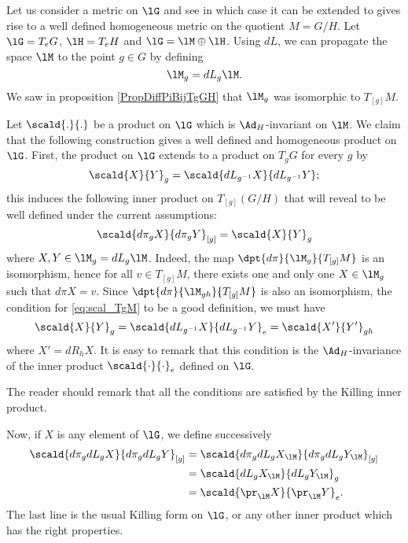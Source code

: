 Let us consider a metric on $\lG$ and see in which case it can be extended to gives rise to a well defined homogeneous metric on the quotient $M=G/H$. Let $\lG=T_eG$, $\lH=T_eH$ and $\lG=\lM\oplus\lH$. Using $dL$, we can propagate the space $\lM$ to the point $g\in G$ by defining
\[
  \lM_g=dL_g\lM.\label{pg:M_g}
\]
We saw in proposition \ref{PropDiffPiBijTgGH} that $\lM_g$ was isomorphic to $T_{[g]}M$.


Let $\scald{.}{.}$ be a product on $\lG$ which is $\Ad_H$-invariant on $\lM$. We claim that the following construction gives a well defined and homogeneous product on $\lG$. First, the product on $\lG$ extends to a product on $T_gG$ for every $g$ by
\[
  \scald{X}{Y}_g=\scald{dL_{g^{-1}}X}{dL_{g^{-1}}Y};
\]
this induces the following inner product on $T_{[g]}(G/H)$ that will reveal to be well defined under the current assumptions:
\begin{equation}\label{eq:scal_TgM}
	\scald{d\pi_g X}{d\pi_g Y}_{[g]}=\scald{X}{Y}_g
\end{equation}
where $X,Y\in \lM_g=dL_g\lM$. Indeed, the map $\dpt{d\pi}{\lM_g}{T_{[g]}M}$ is an isomorphism, hence for all $v\in T_{[g]}M$, there exists one and only one $X\in\lM_g$ such that $d\pi X=v$. Since $\dpt{d\pi}{\lM_{gh}}{T_{[g]}M}$ is also an isomorphism, the condition for \eqref{eq:scal_TgM} to be a good definition, we must have 
\begin{equation}
\scald{X}{Y}_g=\scald{dL_{g^{-1}} X}{dL_{g^{-1}} Y}_e
              =\scald{X'}{Y'}_{gh}
      \end{equation}
where $X'=dR_hX$. It is easy to remark that this condition is the $\Ad_H$-invariance of the inner product $\scald{\cdot}{\cdot}_e$ defined on $\lG$.

The reader should remark that all the conditions are satisfied by the Killing inner product.

Now, if $X$ is any element of $\lG$, we define successively
\begin{equation}		\label{EqDefProdGsurH}
	\begin{aligned}[]
		\scald{d\pi_gdL_gX}{d\pi_gdL_gY }_{[g]}&=\scald{d\pi_gdL_gX_{\lM}}{d\pi_gdL_gY_{\lM}}_{[g]}\\
		&=\scald{dL_gX_{\lM}}{dL_gY_{\lM}}_g\\
		&=\scald{\pr_{\lM}X}{\pr_{\lM}Y}_e.
	\end{aligned}
\end{equation}
The last line is the usual Killing form on $\lG$, or any other inner product which has the right properties.

